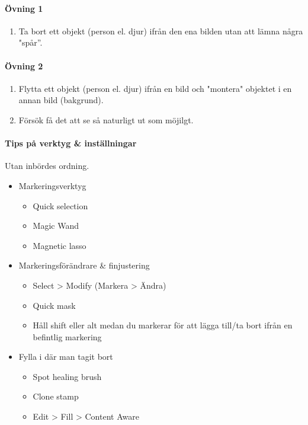 \documentclass{article}
\begin{document}
    \paragraph{Övning 1}
      \begin{enumerate}
        \item Ta bort ett objekt (person el. djur) ifrån den ena bilden utan att lämna några "spår''.
      \end{enumerate}

      \paragraph{Övning 2}
      \begin{enumerate}
        \item Flytta ett objekt (person el. djur) ifrån en bild och "montera" objektet i en annan bild (bakgrund).
        \item Försök få det att se så naturligt ut som möjilgt.
      \end{enumerate}

    \paragraph{Tips på verktyg \& inställningar}
      Utan inbördes ordning.
      \begin{itemize}
        \item Markeringsverktyg
          \begin{itemize}
            \item Quick selection
            \item Magic Wand
            \item Magnetic lasso
          \end{itemize}
        \item Markeringsförändrare \& finjustering
          \begin{itemize}
            \item Select > Modify (Markera > Ändra)
            \item Quick mask
            \item Håll shift eller alt medan du markerar för att lägga till/ta bort ifrån en befintlig markering
          \end{itemize}
        \item Fylla i där man tagit bort
          \begin{itemize}
            \item Spot healing brush
            \item Clone stamp
            \item Edit > Fill > Content Aware
          \end{itemize}
      \end{itemize}
\end{document}
